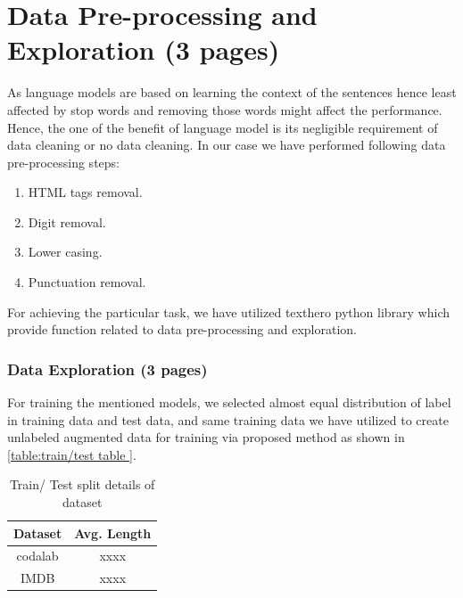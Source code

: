\documentclass[%
	BCOR=8mm, %
	DIV=12, 
	toc=bibliography, %
	toc=listof, %
	oneside, %
	egregdoesnotlikesansseriftitles, %
	]{scrbook}
\begin{document}
\section{Data Pre-processing and Exploration (3 pages)}

As language models are based on learning the context of the sentences hence least affected by stop words and removing those words might affect the performance. Hence, 
the one of the benefit of language model is its negligible requirement of data cleaning or no data cleaning. In our case we have performed following data pre-processing steps:

\begin{enumerate}
\item  HTML tags removal.
\item Digit removal.
\item Lower casing.
\item  Punctuation removal.
\end{enumerate}

For achieving the particular task, we have utilized texthero python library which provide function related to data pre-processing and exploration. 


\subsubsection{Data Exploration (3 pages)}

For training the mentioned models, we selected almost equal distribution of label in training data  and test data, and same training data we have utilized to create 
unlabeled augmented data for training via proposed method as shown in \ref{table:train/test table }. 

\begin{table}[!h]
\centering
\begin{tabular}{ |c|c| } 
\hline
Dataset &  Avg. Length  \\
\hline
codalab & xxxx  \\ 
IMDB & xxxx  \\
\hline
\end{tabular}
\caption[Train/Augment test data]{Train/ Test split details of dataset }
\label{table:Length stat }
\end{table}
\end{document}
